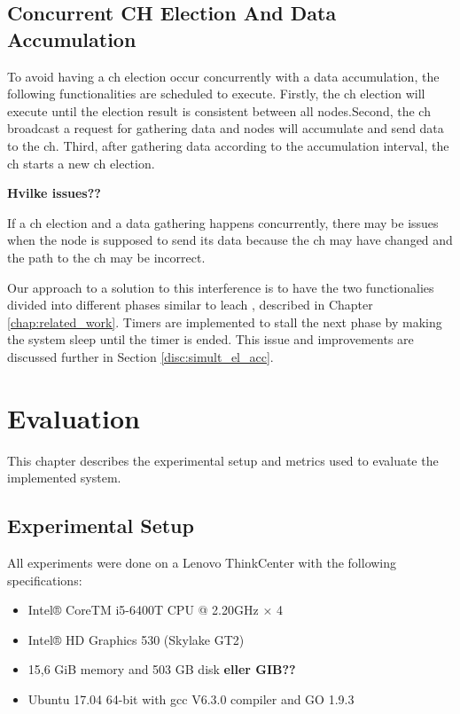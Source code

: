 \documentclass[USenglish]{uit-thesis}
\begin{document}
\newpage

\section{Concurrent CH Election And Data Accumulation} \label{sec:conc_events}
To avoid having a \gls{ch} election occur concurrently with a data accumulation, the following functionalities are scheduled to execute.
Firstly, the \gls{ch} election will execute until the election result is consistent between all nodes.Second, the \gls{ch} broadcast a request for gathering data and nodes will accumulate and send data to the \gls{ch}. Third, after gathering data according to the accumulation interval, the \gls{ch} starts a new \gls{ch} election. 

\textbf{Hvilke issues??}

If a \gls{ch} election and a data gathering happens concurrently, there may be issues when the node is supposed to send its data because the \gls{ch} may have changed and the path to the \gls{ch} may be incorrect. 


Our approach to a solution to this interference is to have the two functionalies divided into different phases similar to \gls{leach} \cite{leach}, described in Chapter \ref{chap:related_work}. Timers are implemented to stall the next phase by making the system sleep until the timer is ended. This issue and improvements are discussed further in Section \ref{disc:simult_el_acc}.







\chapter{Evaluation}
\glsresetall
This chapter describes the experimental setup and metrics used to evaluate the implemented system.

\section{Experimental Setup}
All experiments were done on a Lenovo ThinkCenter with the following specifications:

\begin{itemize} 
\item Intel® CoreTM i5-6400T CPU @ 2.20GHz × 4
\item Intel® HD Graphics 530 (Skylake GT2)
\item 15,6 GiB memory and 503 GB disk \textbf{eller GIB??}
\item Ubuntu 17.04 64-bit with gcc V6.3.0 compiler and GO 1.9.3
\end{itemize}
\end{document}
